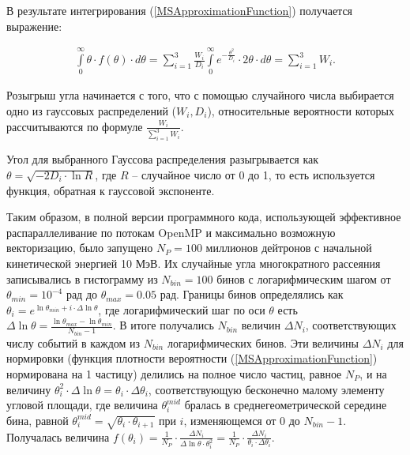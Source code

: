 \documentclass[a4paper,12pt]{article}
\begin{document}
\begin{large}
	В результате интегрирования (\ref{MSApproximationFunction}) получается выражение:
	
\begin{equation}
\label{MSApproximationFunctionIntegral}
\begin{aligned} 
  \int \limits_0^{\infty} \theta \cdot f(\theta) \cdot d\theta=\sum_{i=1}^{3} \frac{W_i}{D_i} \int \limits_0^{\infty} e^{-\frac{\theta^2}{D_i}} \cdot 2 \theta\cdot d\theta = \sum_{i=1}^{3} W_i.
\end{aligned}
\end{equation}

  Розыгрыш угла начинается с того, что с помощью случайного числа выбирается одно из гауссовых распределений ($W_i,D_i$), относительные вероятности которых рассчитываются по формуле $\frac{W_i}{\sum_{i=1}^{3}W_i}$.
  
  Угол для выбранного Гауссова распределения разыгрывается как $\theta=\sqrt{-2D_i\cdot\ln{R}}$, где $R$ -- случайное число от 0 до 1, то есть используется функция, обратная к гауссовой экспоненте.
  
  Таким образом, в полной версии программного кода, использующей эффективное распараллеливание по потокам OpenMP и максимально возможную векторизацию, было запущено $N_P=100$ миллионов дейтронов с начальной кинетической энергией 10 МэВ. Их случайные угла многократного рассеяния записывались в гистограмму из $N_{bin}=100$ бинов с логарифмическим шагом от $\theta_{min}=10^{-4}$ рад до $\theta_{max}=0.05$ рад. Границы бинов определялись как $\theta_i=e^{\ln{\theta_{min}+i \cdot \Delta \ln{\theta}}}$, где логарифмический шаг по оси $\theta$ есть $\Delta \ln{\theta}=\frac{\ln{\theta_{max}}-\ln{\theta_{min}}}{N_{bin}-1}$. В итоге получались $N_{bin}$ величин $\Delta N_i$, соответствующих числу событий в каждом из $N_{bin}$ логарифмических бинов. Эти величины $\Delta N_i$ для нормировки (функция плотности вероятности (\ref{MSApproximationFunction}) нормирована на 1 частицу) делились на полное число частиц, равное $N_P$, и на величину $\theta_i^2 \cdot \Delta \ln{\theta}=\theta_i \cdot \Delta \theta_i$, соответствующую бесконечно малому элементу угловой площади, где величина $\theta^{mid}_i$ бралась в среднегеометрической середине бина, равной $\theta^{mid}_i=\sqrt{ \theta_i \cdot \theta_{i+1}}$ при $i$, изменяющемся от 0 до $N_{bin}-1$. Получалась величина $f(\theta_i)=\frac{1}{N_P} \cdot \frac{\Delta N_i}{\Delta\ln{\theta} \cdot \theta^2_i}=\frac{1}{N_P} \cdot \frac{\Delta N_i}{\theta_i \cdot \Delta \theta_i}$.
  

\end{large}
\end{document}
